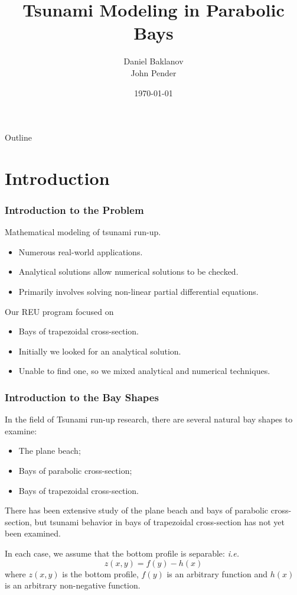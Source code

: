 \documentclass[xcolor=dvipsnames]{beamer}
\title[Tsunami Modeling]{Tsunami Modeling in Parabolic Bays}
\author{Daniel Baklanov \\ John Pender}
\date{\today}
\institute{University of Alaska Fairbanks}
\begin{document}
\begin{frame}
\titlepage
\end{frame}

\begin{frame}{Outline}
\tableofcontents
\end{frame}

\section{Introduction}

\begin{frame}
\frametitle{Introduction to the Problem}
Mathematical modeling of tsunami run-up.
\begin{itemize}
\item Numerous real-world applications.
\item Analytical solutions allow numerical solutions to be checked.
\item Primarily involves solving non-linear partial differential equations.
\end{itemize}
Our REU program focused on
\begin{itemize}
\item Bays of trapezoidal cross-section.
\item Initially we looked for an analytical solution.
\item Unable to find one, so we mixed analytical and numerical techniques.
\end{itemize}
\end{frame}

\begin{frame}
\frametitle{Introduction to the Bay Shapes}
In the field of Tsunami run-up research, there are several natural bay shapes to examine:
\begin{itemize}
\item The plane beach;
\item Bays of parabolic cross-section;
\item Bays of trapezoidal cross-section.
\end{itemize}
There has been extensive study of the plane beach and bays of parabolic cross-section, but tsunami behavior in bays of trapezoidal cross-section has not yet been examined.

In each case, we assume that the bottom profile is separable: \emph{i.e.}
\[
z(x,y) = f(y) - h(x)
\]
where $z(x,y)$ is the bottom profile, $f(y)$ is an arbitrary function and $h(x)$ is an arbitrary non-negative function.
\end{frame}
\end{document}
